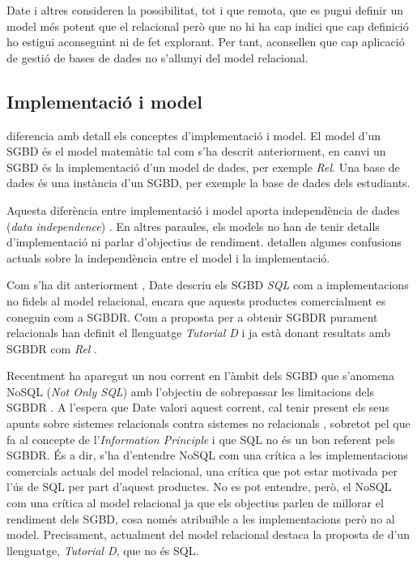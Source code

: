 Date i altres consideren la possibilitat, tot i que remota, que es pugui definir un model més potent que el relacional però que no hi ha cap indici que cap definició ho estigui aconseguint ni de fet explorant. Per tant, aconsellen que cap aplicació de gestió de bases de dades no s'allunyi del model relacional.





\subsection{Implementació i model}

\textcite{date:introduction} diferencia amb detall els conceptes d'implementació i model.
El model d'un SGBD és el model matemàtic tal com s'ha descrit anteriorment, en canvi un SGBD és la implementació d'un model de dades, per exemple \emph{Rel}.
Una base de dades és una instància d'un SGBD, per exemple la base de dades dels estudiants.



Aquesta diferència entre implementació i model aporta independència de dades (\emph{data independence}) \parencite{date:dictionary}. En altres paraules, els models no han de tenir detalls d'implementació ni parlar d'objectius de rendiment. 
\textcite{dbdebunk} detallen algunes confusions actuals sobre la independència entre el model i la implementació.


Com s'ha dit anteriorment , Date descriu els SGBD \emph{SQL} com a implementacions no fidels al model relacional, encara que aquests productes comercialment es coneguin com a SGBDR. Com a proposta per a obtenir SGBDR purament relacionals \textcite{date05,date:tutoriald} han definit el llenguatge \emph{Tutorial D} i ja està donant resultats amb SGBDR com \emph{Rel} .


Recentment ha aparegut un nou corrent en l'àmbit dels SGBD que s'anomena NoSQL (\emph{Not Only SQL}) amb l'objectiu de sobrepassar les limitacions dels SGBDR \parencite{edlich:nosql,stonebraker10}. 
A l'espera que Date valori aquest corrent, cal tenir present els seus apunts sobre sistemes relacionals contra sistemes no relacionals \parencite[part 7]{date06}, sobretot pel que fa al concepte de l'\emph{Information Principle} i que SQL no és un bon referent pels SGBDR. És a dir, s'ha d'entendre NoSQL com una crítica a les implementacions comercials actuals del model relacional, una crítica que pot estar motivada per l'ús de SQL per part d'aquest productes. 
No es pot entendre, però, el NoSQL com una crítica al model relacional ja que els objectius parlen de millorar el rendiment dels SGBD, cosa només atribuïble a les implementacions però no al model. Precisament, actualment del model relacional destaca la proposta de \citeauthor{date:tutoriald} d'un llenguatge, \emph{Tutorial D}, que no és SQL.


